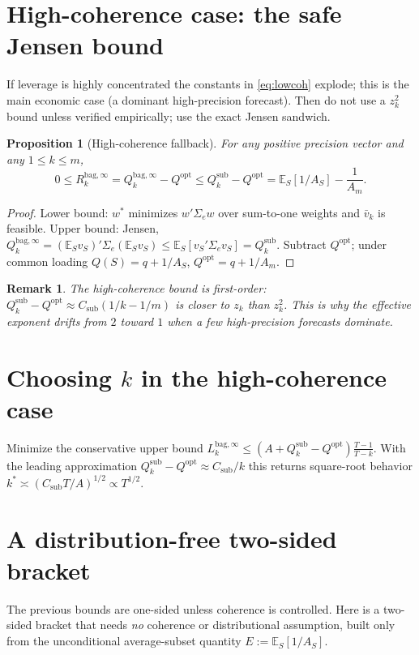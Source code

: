 \documentclass[11pt]{article}
\newcommand{\Sig}{\Sigma_e}
\newcommand{\E}{\mathbb{E}}
\newcommand{\Rk}{R_k^{\mathrm{bag},\infty}}
\newcommand{\Qsub}{Q_k^{\mathrm{sub}}}
\newcommand{\Qopt}{Q^{\mathrm{opt}}}
\newtheorem{proposition}{Proposition}
\newtheorem{remark}{Remark}
\begin{document}
\section{High-coherence case: the safe Jensen bound}
If leverage is highly concentrated the constants in \eqref{eq:lowcoh} explode; this is the
main economic case (a dominant high-precision forecast). Then do not use a $z_k^2$ bound
unless verified empirically; use the exact Jensen sandwich.
\begin{proposition}[High-coherence fallback]\label{prop:jensen}
For any positive precision vector and any $1\le k\le m$,
\begin{equation}\label{eq:jensen}
  0\le \Rk=Q_k^{\mathrm{bag},\infty}-\Qopt\le \Qsub-\Qopt
  =\E_S[1/A_S]-\frac{1}{A_m}.
\end{equation}
\end{proposition}
\begin{proof}
Lower bound: $w^*$ minimizes $w'\Sig w$ over sum-to-one weights and $\bar v_k$ is feasible.
Upper bound: Jensen, $Q_k^{\mathrm{bag},\infty}=(\E_Sv_S)'\Sig(\E_Sv_S)\le\E_S[v_S'\Sig v_S]=\Qsub$.
Subtract $\Qopt$; under common loading $Q(S)=q+1/A_S$, $\Qopt=q+1/A_m$.
\end{proof}
\begin{remark}
The high-coherence bound is first-order: $\Qsub-\Qopt\approx C_{\mathrm{sub}}(1/k-1/m)$ is
closer to $z_k$ than $z_k^2$. This is why the effective exponent drifts from $2$ toward $1$
when a few high-precision forecasts dominate.
\end{remark}

\section{Choosing $k$ in the high-coherence case}
Minimize the conservative upper bound
$L_k^{\mathrm{bag},\infty}\le(A+\Qsub-\Qopt)\frac{T-1}{T-k}$. With the leading approximation
$\Qsub-\Qopt\approx C_{\mathrm{sub}}/k$ this returns square-root behavior
$k^*\asymp(C_{\mathrm{sub}}T/A)^{1/2}\propto T^{1/2}$.

\section{A distribution-free two-sided bracket}
\label{sec:bracket}
The previous bounds are one-sided unless coherence is controlled. Here is a two-sided
bracket that needs \emph{no} coherence or distributional assumption, built only from the
unconditional average-subset quantity $E:=\E_S[1/A_S]$.
\end{document}
